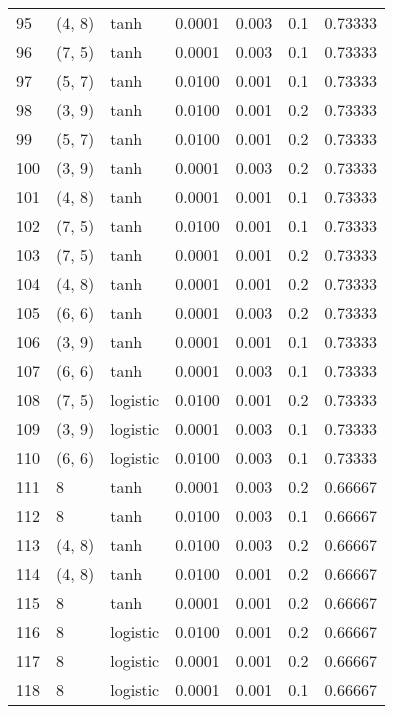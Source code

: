\begin{tabular}{lllrrrr}
95  &      (4, 8) &      tanh &  0.0001 &  0.003 &  0.1 &   0.73333 \\
96  &      (7, 5) &      tanh &  0.0001 &  0.003 &  0.1 &   0.73333 \\
97  &      (5, 7) &      tanh &  0.0100 &  0.001 &  0.1 &   0.73333 \\
98  &      (3, 9) &      tanh &  0.0100 &  0.001 &  0.2 &   0.73333 \\
99  &      (5, 7) &      tanh &  0.0100 &  0.001 &  0.2 &   0.73333 \\
100 &      (3, 9) &      tanh &  0.0001 &  0.003 &  0.2 &   0.73333 \\
101 &      (4, 8) &      tanh &  0.0001 &  0.001 &  0.1 &   0.73333 \\
102 &      (7, 5) &      tanh &  0.0100 &  0.001 &  0.1 &   0.73333 \\
103 &      (7, 5) &      tanh &  0.0001 &  0.001 &  0.2 &   0.73333 \\
104 &      (4, 8) &      tanh &  0.0001 &  0.001 &  0.2 &   0.73333 \\
105 &      (6, 6) &      tanh &  0.0001 &  0.003 &  0.2 &   0.73333 \\
106 &      (3, 9) &      tanh &  0.0001 &  0.001 &  0.1 &   0.73333 \\
107 &      (6, 6) &      tanh &  0.0001 &  0.003 &  0.1 &   0.73333 \\
108 &      (7, 5) &  logistic &  0.0100 &  0.001 &  0.2 &   0.73333 \\
109 &      (3, 9) &  logistic &  0.0001 &  0.003 &  0.1 &   0.73333 \\
110 &      (6, 6) &  logistic &  0.0100 &  0.003 &  0.1 &   0.73333 \\
111 &           8 &      tanh &  0.0001 &  0.003 &  0.2 &   0.66667 \\
112 &           8 &      tanh &  0.0100 &  0.003 &  0.1 &   0.66667 \\
113 &      (4, 8) &      tanh &  0.0100 &  0.003 &  0.2 &   0.66667 \\
114 &      (4, 8) &      tanh &  0.0100 &  0.001 &  0.2 &   0.66667 \\
115 &           8 &      tanh &  0.0001 &  0.001 &  0.2 &   0.66667 \\
116 &           8 &  logistic &  0.0100 &  0.001 &  0.2 &   0.66667 \\
117 &           8 &  logistic &  0.0001 &  0.001 &  0.2 &   0.66667 \\
118 &           8 &  logistic &  0.0001 &  0.001 &  0.1 &   0.66667 \\

\end{tabular}
